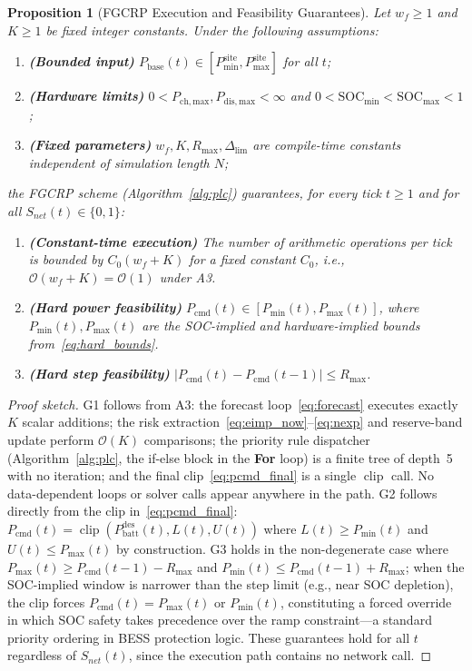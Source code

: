 \documentclass[preprint,12pt]{elsarticle}
\newtheorem{proposition}{Proposition}
\newcommand{\Rmax}{R_{\max}}
\newcommand{\SOC}{\mathrm{SOC}}
\newcommand{\Pbatt}{P_{\mathrm{batt}}}
\newcommand{\Pcmd}{P_{\mathrm{cmd}}}
\newcommand{\Pbase}{P_{\mathrm{base}}}
\newcommand{\Dlim}{\Delta_{\lim}}
\DeclareMathOperator{\clip}{clip}
\begin{document}
\begin{proposition}[FGCRP Execution and Feasibility Guarantees]
\label{prop:fgcrp}
Let $w_f\ge 1$ and $K\ge 1$ be fixed integer constants. Under the following assumptions:
\begin{enumerate}[label=\textbf{A\arabic*}]
  \item \textbf{(Bounded input)} $\Pbase(t)\in[P_{\min}^{\mathrm{site}}, P_{\max}^{\mathrm{site}}]$ for all $t$;
  \item \textbf{(Hardware limits)} $0 < P_{\mathrm{ch,max}}, P_{\mathrm{dis,max}} < \infty$ and $0 < \SOC_{\min} < \SOC_{\max} < 1$;
  \item \textbf{(Fixed parameters)} $w_f, K, \Rmax, \Dlim$ are compile-time constants independent of simulation length $N$;
\end{enumerate}
the FGCRP scheme (Algorithm~\ref{alg:plc}) guarantees, for every tick $t \ge 1$ and for all $S_{net}(t)\in\{0,1\}$:
\begin{enumerate}[label=\textbf{G\arabic*}]
  \item \textbf{(Constant-time execution)} The number of arithmetic operations per tick is bounded by $C_0(w_f + K)$ for a fixed constant $C_0$, i.e., $\mathcal{O}(w_f+K)=\mathcal{O}(1)$ under A3.
  \item \textbf{(Hard power feasibility)} $\Pcmd(t)\in[P_{\min}(t), P_{\max}(t)]$, where $P_{\min}(t), P_{\max}(t)$ are the SOC-implied and hardware-implied bounds from~\eqref{eq:hard_bounds}.
  \item \textbf{(Hard step feasibility)} $|\Pcmd(t) - \Pcmd(t-1)| \le \Rmax$.
\end{enumerate}
\end{proposition}
\begin{proof}[Proof sketch]
G1 follows from A3: the forecast loop~\eqref{eq:forecast} executes exactly $K$ scalar additions; the risk extraction~\eqref{eq:eimp_now}--\eqref{eq:nexp} and reserve-band update perform $\mathcal{O}(K)$ comparisons; the priority rule dispatcher (Algorithm~\ref{alg:plc}, the if-else block in the \textbf{For} loop) is a finite tree of depth~5 with no iteration; and the final clip~\eqref{eq:pcmd_final} is a single $\clip$ call. No data-dependent loops or solver calls appear anywhere in the path. G2 follows directly from the clip in~\eqref{eq:pcmd_final}: $\Pcmd(t)=\clip(\Pbatt^{\mathrm{des}}(t), L(t), U(t))$ where $L(t)\ge P_{\min}(t)$ and $U(t)\le P_{\max}(t)$ by construction. G3 holds in the non-degenerate case where $P_{\max}(t)\ge\Pcmd(t-1)-\Rmax$ and $P_{\min}(t)\le\Pcmd(t-1)+\Rmax$; when the SOC-implied window is narrower than the step limit (e.g., near SOC depletion), the clip forces $\Pcmd(t)=P_{\max}(t)$ or $P_{\min}(t)$, constituting a forced override in which SOC safety takes precedence over the ramp constraint---a standard priority ordering in BESS protection logic. These guarantees hold for all $t$ regardless of $S_{net}(t)$, since the execution path contains no network call.
\end{proof}
\end{document}
